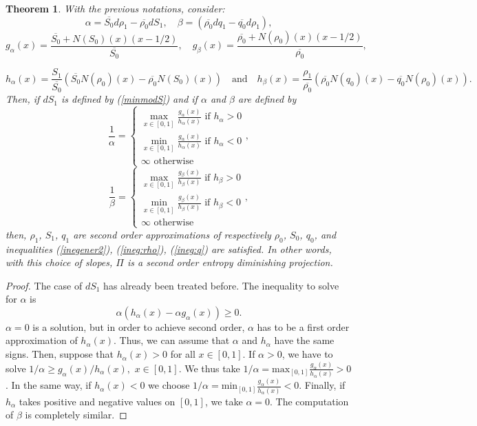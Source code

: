 \documentclass{fldauth}
\theoremstyle{plain}
\newtheorem{thm}{Theorem}
\theoremstyle{plain}
\theoremstyle{plain}
\theoremstyle{plain}
\theoremstyle{plain}
\theoremstyle{plain}
\newtheorem{proof}{Proof}
\begin{document}
\begin{thm}\label{maintheo}
With the previous notations, consider:
\[
\alpha =\overline{S_{0}}d\rho _{1}-\overline{\rho _{0}}dS_{1},\quad \beta =(\overline{\rho _{0}}dq_{1}-\overline{q_{0}}d\rho _{1}),\]
\[
g_{\alpha }(x)=\frac{\overline{S_{0}}+N(S_{0})(x)(x-1/2)}{\overline{S_{0}}},\quad g_{\beta }(x)=\frac{\overline{\rho _{0}}+N(\rho _{0})(x)(x-1/2)}{\overline{\rho _{0}}},\]

\[
h_{\alpha }(x)=\frac{S_{1}}{\overline{S_{0}}}(\overline{S_{0}}N(\rho _{0})(x)-\overline{\rho _{0}}N(S_{0})(x))\quad \textrm{and}\quad h_{\beta }(x)=\frac{\rho _{1}}{\overline{\rho _{0}}}(\overline{\rho _{0}}N(q_{0})(x)-\overline{q_{0}}N(\rho _{0})(x)).\]
Then, if \( dS_{1} \) is defined by (\ref{minmodS}) and if \( \alpha  \)
and \( \beta  \) are defined by
\[
\frac{1}{\alpha }=\left\{ \begin{array}{c}
\max _{x\in [0,1]}\frac{g_{\alpha }(x)}{h_{\alpha }(x)}\textrm{ if }h_{\alpha }>0\\
\min _{x\in [0,1]}\frac{g_{\alpha }(x)}{h_{\alpha }(x)}\textrm{ if }h_{\alpha }<0\\
\infty \textrm{ otherwise}
\end{array}\right. ,\]
\[
\frac{1}{\beta }=\left\{ \begin{array}{c}
\max _{x\in [0,1]}\frac{g_{\beta }(x)}{h_{\beta }(x)}\textrm{ if }h_{\beta }>0\\
\min _{x\in [0,1]}\frac{g_{\beta }(x)}{h_{\beta }(x)}\textrm{ if }h_{\beta }<0\\
\infty \textrm{ otherwise}
\end{array}\right. ,\]
then, \( \rho _{1} \), \( S_{1} \), \( q_{1} \) are second order approximations
of respectively \( \rho _{0} \), \( S_{0} \), \( q_{0} \), and inequalities
(\ref{inegener2}), (\ref{ineg:rho}), (\ref{ineg:q}) are satisfied. In other
words, with this choice of slopes, \( \Pi  \) is a second order entropy diminishing
projection.
\end{thm}
\begin{proof}
The case of \( dS_{1} \) has already been treated before. The inequality to
solve for \( \alpha  \) is
\[
\alpha (h_{\alpha }(x)-\alpha g_{\alpha }(x))\geq 0.\]
\( \alpha =0 \) is a solution, but in order to achieve second order, \( \alpha  \)
has to be a first order approximation of \( h_{\alpha }(x) \). Thus, we can
assume that \( \alpha  \) and \( h_{\alpha } \) have the same signs. Then,
suppose that \( h_{\alpha }(x)>0 \) for all \( x\in [0,1] \). If \( \alpha >0 \),
we have to solve \( 1/\alpha \geq g_{\alpha }(x)/h_{\alpha }(x), \) \( x\in [0,1] \).
We thus take \( 1/\alpha =\textrm{max}_{[0,1]}\frac{g_{\alpha }(x)}{h_{\alpha }(x)}>0 \).
In the same way, if \( h_{\alpha }(x)<0 \) we choose \( 1/\alpha =\textrm{min}_{[0,1]}\frac{g_{\alpha }(x)}{h_{\alpha }(x)}<0 \).
Finally, if \( h_{\alpha } \) takes positive and negative values on \( [0,1] \),
we take \( \alpha =0 \). The computation of \( \beta  \) is completely similar.
\end{proof}
\end{document}
